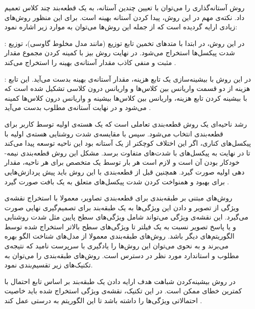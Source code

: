 روش آستانه‌گذاری را می‌توان با تعیین چندین آستانه، به یک قطعه‌بند چند کلاس تعمیم داد. نکته‌ی مهم در این روش، پیدا کردن آستانه بهینه است. برای این منظور روش‌های زیادی ارایه گردیده‌ است که از جمله این روش‌ها می‌توان به موارد زیر اشاره نمود:

 : در این روش، در ابتدا با متدهای تخمین تابع توزیع (مانند مدل مخلوط گاوسی)، توزیع شدت پیکسل‌ها استخراج می‌شود. در نهایت روش بیز با کمینه کردن مجموع مقدار  مثبت و منفی کاذب مقدار آستانه‌ی بهینه را استخراج می‌کند .

 : در این روش با بیشینه‌سازی یک تابع هزینه، مقدار آستانه‌ی بهینه بدست می‌آید. این تابع هزینه از دو قسمت واریانس بین کلاس‌ها و واریانس درون کلاسی تشکیل شده است که با بیشینه کردن تابع هزینه، واریانس بین کلاس‌ها بیشینه و واریانس درون کلاس‌ها کمینه می‌شود و در نهایت آستانه‌ی مطلوب بدست می‌آید .

رشد ناحیه‌ای یک روش قطعه‌بندی تعاملی است که یک هسته‌ی اولیه توسط کاربر برای قطعه‌بندی انتخاب می‌شود. سپس با مقایسه‌ی شدت روشنایی هسته‌ی اولیه با پیکسل‌های کناری، اگر این اختلاف کوچکتر از یک آستانه بود این ناحیه توسعه پیدا می‌کند تا در نهایت به پیکسل‌های با شدت‌های متفاوت برسد. مشکل این روش قطعه‌بندی نیمه-خودکار بودن آن است و لازم است هر بار توسط یک متخصص برای هر ناحیه، مقدار دهی اولیه صورت گیرد. همچنین قبل از قطعه‌بندی با این روش باید پیش پردازش‌هایی برای بهبود و همنواخت کردن شدت پیکسل‌های متعلق به یک بافت صورت گیرد .

روش‌های مبتنی بر طبقه‌بندی برای قطعه‌بندی تصاویر، معمولا با استخراج نقشه‌ی ویژگی از تصویر و دادن این ویژگی‌ها به یک طبقه‌بند برای تصمیم‌گیری نهایی صورت می‌گیرد. این نقشه‌ی ویژگی می‌تواند شامل ویژگی‌های سطح پایین مثل شدت روشنایی و یا پاسخ تصویر نسبت به یک فیلتر تا ویژگی‌های سطح بالاتر استخراج شده توسط الگوریتم‌های دیگر باشد. روش‌های طبقه‌بندی معمولا از مدل‌های شناخت الگو بهره می‌برند و به نحوی می‌توان این روش‌ها را یادگیری با سرپرست نامید که نتیجه‌ی مطلوب و استاندارد مورد نظر در دسترس است. روش‌های طبقه‌بندی را می‌توان به تکنیک‌های زیر تقسیم‌بندی نمود.

در روش‌‌ بیشینه‌کردن شباهت هدف ارایه دادن یک طبقه‌بند بر اساس تابع احتمال با کمترین خطای ممکن است. در این تکنیک، نقشه‌ی ویژگی استخراج شده باید خاصیت احتمالاتی ویژگی‌ها را داشته باشد تا این الگوریتم به درستی عمل کند .


